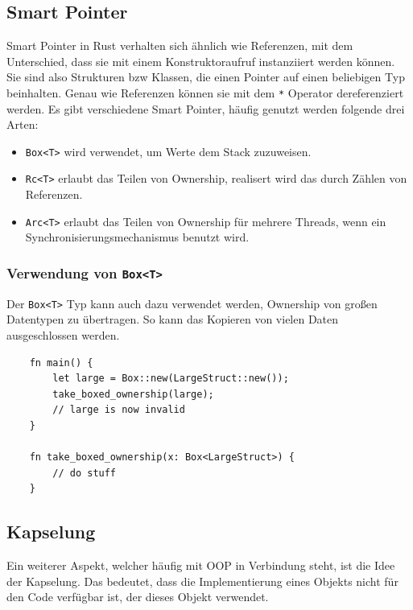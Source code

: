 \subsection{Smart Pointer}\label{chap:smpointer}

Smart Pointer in Rust verhalten sich ähnlich wie Referenzen, mit dem Unterschied, dass sie mit einem Konstruktoraufruf instanziiert werden können. Sie sind also Strukturen bzw Klassen, die einen Pointer auf einen beliebigen Typ beinhalten. Genau wie Referenzen können sie mit dem \verb"*" Operator dereferenziert werden. Es gibt verschiedene Smart Pointer, häufig genutzt werden folgende drei Arten:

\begin{itemize}
    \item \verb"Box<T>" wird verwendet, um Werte dem Stack zuzuweisen.
    \item \verb"Rc<T>" erlaubt das Teilen von Ownership, realisert wird das durch Zählen von Referenzen.
    \item \verb"Arc<T>" erlaubt das Teilen von Ownership für mehrere Threads, wenn ein Synchronisierungsmechanismus benutzt wird.
\end{itemize}

\subsubsection{Verwendung von \texttt{Box<T>}}

Der \verb"Box<T>" Typ kann auch dazu verwendet werden, Ownership von großen Datentypen zu übertragen. So kann das Kopieren von vielen Daten ausgeschlossen werden.

\begin{lstlisting}
    fn main() {
        let large = Box::new(LargeStruct::new());
        take_boxed_ownership(large);
        // large is now invalid
    }
    
    fn take_boxed_ownership(x: Box<LargeStruct>) {
        // do stuff
    }
\end{lstlisting}

\subsection{Kapselung}

Ein weiterer Aspekt, welcher häufig mit OOP in Verbindung steht, ist die Idee der Kapselung. Das bedeutet, dass die Implementierung eines Objekts nicht für den Code verfügbar ist, der dieses Objekt verwendet.

